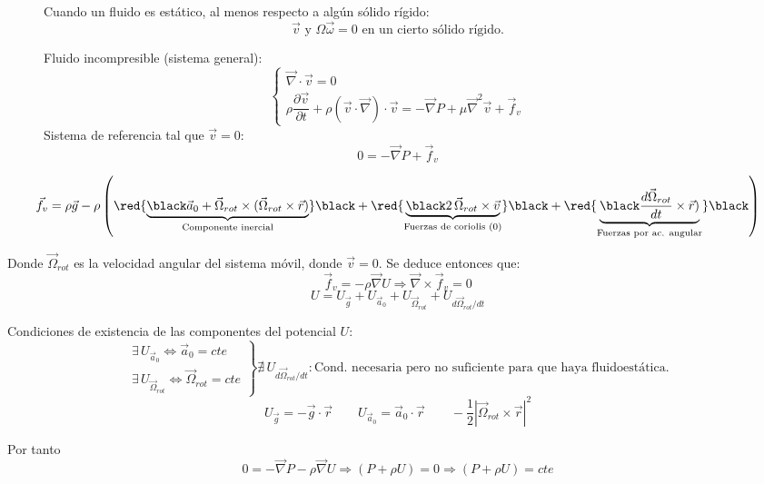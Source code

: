 \begin{figure}[H]
\begin{minipage}{0.5\textwidth}
\begin{figure}[H]
				\label{fig:my_label}
			\end{figure}
		\end{minipage}
		\begin{minipage}{0.5\textwidth}
			Cuando un fluido es estático, al menos respecto a algún sólido rígido:
			\[\vec v \text{ y } \Omega \vec \omega = 0 \text{ en un cierto sólido rígido.}\]
			
			Fluido incompresible (sistema general):
			\[			
			\left\{
			\begin{matrix}
				\vec \nabla \cdot \vec v = 0\\
				\rho \dfrac{\partial \vec v}{\partial t} + \rho (\vec v \cdot \vec \nabla)\cdot \vec v = - \vec \nabla P + \mu \vec \nabla^2 \vec v + \vec f_v
			\end{matrix}
			\right.
			\]
			Sistema de referencia tal que $\vec v = 0$:
			\[0 = -\vec \nabla P + \vec f_v\]
		\end{minipage}
	\end{figure}

	
	
	\[\vec f_v = \rho \vec g 
	- \rho \left(
	\red{\underbrace{\black \vec a_0 + \vec \Omega_{rot} \times (\vec \Omega_{rot} \times \vec r)}_{\text{Componente inercial}}} \black
	+ 
	\red{\underbrace{\black 2\,\vec \Omega_{rot}\times \vec v}_{\text{Fuerzas de coriolis (0)}}} \black
	+ 
	\red{\underbrace{\black \dfrac{d\vec \Omega_{rot}}{dt}\times \vec r)}_{\text{Fuerzas por ac. angular}}} \black \right)
	\]
	
	
	Donde $\vec \Omega_{rot}$ es la velocidad angular del sistema móvil, donde $\vec v = 0$. Se deduce entonces que:
	\[\vec f_v = -\rho \vec \nabla U \Rightarrow \vec \nabla \times \vec f_v = 0\]
	\[U = U_{\vec g} + U_{\vec a_0} + U_{\vec \Omega_{rot}} + U_{d\vec \Omega_{rot}/dt}\]
	
	Condiciones de existencia de las componentes del potencial $U$:
	\[
	\left.
	\begin{matrix}
		\exists \, U_{\vec a_0} \Longleftrightarrow \vec a_0 = cte \\
		\exists \, U_{\vec \Omega_{rot}} \Longleftrightarrow \vec \Omega_{rot} = cte
	\end{matrix}
	\right\}
	\nexists \, U_{d\vec \Omega_{rot}/dt} : \text{Cond. necesaria pero no suficiente para que haya fluidoestática.}
	\]
	\[U_{\vec g} = -\vec g \cdot \vec r \qquad U_{\vec a_0} = \vec a_0 \cdot \vec r \qquad -\dfrac{1}{2}\left|\vec \Omega_{rot}\times \vec r\right|^2\]
	
	
	Por tanto
	\[0 = -\vec \nabla P - \rho \vec \nabla U \Rightarrow (P + \rho U) = 0 \Rightarrow (P + \rho U) = cte\]
	
